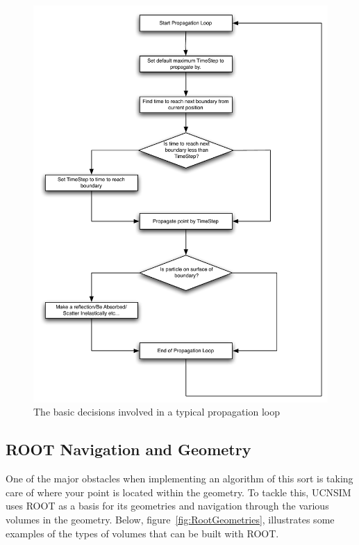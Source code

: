 \documentclass[11pt,a4paper,oneside]{article}
\begin{document}
\begin{figure}[!htbp] 
\begin{center}
\includegraphics[scale=0.6]{designdocumentimages/fig5-PropagationLoop}
\end{center}
\caption{The basic decisions involved in a typical propagation loop}
\label{fig:PropagationLoop}
\end{figure}

\subsection{ROOT Navigation and Geometry}

One of the major obstacles when implementing an algorithm of this sort is taking care of where your point is located within the geometry. To tackle this, UCNSIM uses ROOT as a basis for its geometries and navigation through the various volumes in the geometry. Below, figure~\ref{fig:RootGeometries}, illustrates some examples of the types of volumes that can be built with ROOT. 
\end{document}
